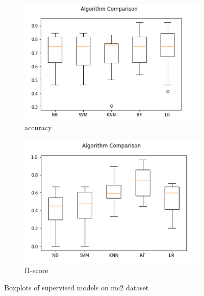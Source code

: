\begin{figure}[h!]
  \centering
  \begin{subfigure}[b]{0.4\linewidth}
    \includegraphics[width=\linewidth]{report/mc2.png}
    \caption{accuracy}
  \end{subfigure}
  \begin{subfigure}[b]{0.4\linewidth}
    \includegraphics[width=\linewidth]{report/mc2_f.png}
    \caption{f1-score}
  \end{subfigure}
  \caption{Boxplots of supervised models on mc2 dataset}
\end{figure}

